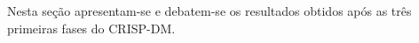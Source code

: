 Nesta seção apresentam-se e debatem-se os resultados obtidos após as três primeiras
fases do CRISP-DM.
